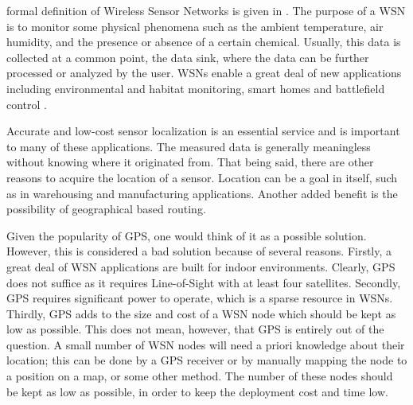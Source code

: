 
% 

formal definition of Wireless Sensor Networks is given in \cite{akyildiz2002wsn}. The purpose of a WSN is to monitor some physical phenomena such as the ambient temperature, air humidity, and the presence or absence of a certain chemical. Usually, this data is collected at a common point, the data sink, where the data can be further processed or analyzed by the user. WSNs enable a great deal of new applications including environmental and habitat monitoring, smart homes and battlefield control \cite{tolle2005mr} \cite{chong2003sne}.

Accurate and low-cost sensor localization is an essential service and is important to many of these applications. The measured data is generally meaningless without knowing where it originated from. That being said, there are other reasons to acquire the location of a sensor. Location can be a goal in itself, such as in warehousing and manufacturing applications. Another added benefit is the possibility of geographical based routing. 

Given the popularity of GPS, one would think of it as a possible solution. However, this is considered a bad solution because of several reasons. Firstly, a great deal of WSN applications are built  for indoor environments. Clearly, GPS does not suffice as it requires Line-of-Sight with at least four satellites. Secondly, GPS requires significant power to operate, which is a sparse resource in WSNs. Thirdly, GPS adds to the size and cost of a WSN node which should be kept as low as possible. This does not mean, however, that GPS is entirely out of the question. A small number of WSN nodes will need a priori knowledge about their location; this can be done by a GPS receiver or by manually mapping the node to a position on a map, or some other method. The number of these nodes should be kept as low as possible, in order to keep the deployment cost and time low. 

